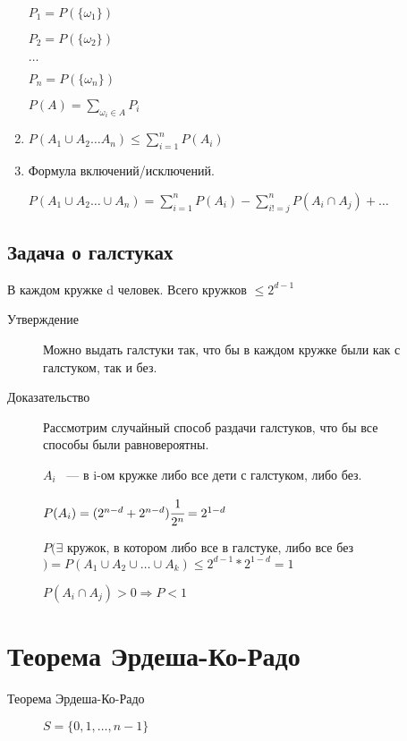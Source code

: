\documentclass[12pt]{article}
\begin{document}
\begin{description}
\begin{enumerate}
$P_1 = P(\{\omega_1\})$

$P_2 = P(\{\omega_2\})$

$\ldots$

$P_n = P(\{\omega_n\})$

$P(A) = \sum_{\omega_i \in A} P_i$

\item $P(A_1 \cup A_2 \ldots A_n) \le \sum_{i = 1}^{n} P(A_i)$
\item Формула включений/исключений.

$P(A_1 \cup A_2 \ldots \cup A_n) = \sum_{i =1}^{n}P(A_i)  - \sum_{i != j}^{n} P(A_i \cap A_j) + \ldots$

\end{enumerate}


 
\subsection{Задача о галстуках}

В каждом кружке d человек. Всего кружков $\le 2^{d - 1}$
\begin{description}
\item[Утверждение] Можно выдать галстуки так, что бы в каждом кружке были как с галстуком, так и без.

\item[Доказательство] Рассмотрим случайный способ раздачи галстуков, что бы все способы были равновероятны. 

$A_i$ ~--- в i-ом кружке либо все дети с галстуком, либо без. 

$P(A_i) = (2^{n - d} + 2^{n - d}) \cfrac{1}{2^n} = 2^{1 - d}$

$P(\exists$ кружок, в котором либо все в галстуке, либо все без$) = P(A_1 \cup A_2 \cup \ldots \cup A_k) \le 2^{d - 1} * 2^{1 - d} = 1$

$P(A_i \cap A_j) > 0 \Rightarrow P < 1$ 

\end{description}

\section{Теорема Эрдеша-Ко-Радо}

\begin{description}

\item[Теорема Эрдеша-Ко-Радо]

$S = \{0, 1, \ldots, n - 1\}$


\end{description}
\end{description}
\end{document}
